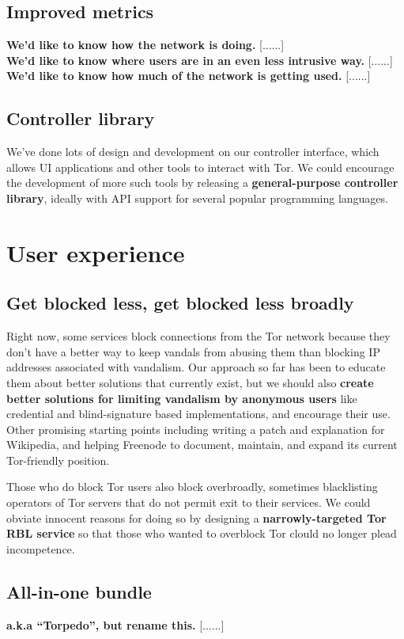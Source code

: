 \documentclass{article}
\newcommand{\tmp}[1]{{\bf #1} [......] \\}
\begin{document}
\subsection{Improved metrics}
\tmp{We'd like to know how the network is doing.}

\tmp{We'd like to know where users are in an even less intrusive way.}

\tmp{We'd like to know how much of the network is getting used.}

\subsection{Controller library}
We've done lots of design and development on our controller interface, which
allows UI applications and other tools to interact with Tor.  We could
encourage the development of more such tools by releasing a {\bf
  general-purpose controller library}, ideally with API support for several
popular programming languages.

\section{User experience}

\subsection{Get blocked less, get blocked less broadly}
Right now, some services block connections from the Tor network because
they don't have a better
way to keep vandals from abusing them than blocking IP addresses associated
with vandalism.  Our approach so far has been to educate them about better
solutions that currently exist, but we should also {\bf create better
solutions for limiting vandalism by anonymous users} like credential and
blind-signature based implementations, and encourage their use. Other
promising starting points including writing a patch and explanation for
Wikipedia, and helping Freenode to document, maintain, and expand its
current Tor-friendly position.

Those who do block Tor users also block overbroadly, sometimes blacklisting
operators of Tor servers that do not permit exit to their services.  We could
obviate innocent reasons for doing so by designing a {\bf narrowly-targeted Tor
  RBL service} so that those who wanted to overblock Tor clould no longer
plead incompetence.

\subsection{All-in-one bundle}
\tmp{a.k.a ``Torpedo'', but rename this.}
\end{document}
